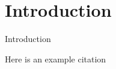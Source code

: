 \chapter{Introduction}
\label{Ch-1:Sec:Introduction}

Introduction

Here is an example citation \citep{RashidiSMCA09} 